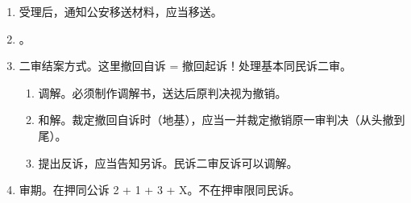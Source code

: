 \begin{enumerate}
\begin{enumerate}
          \item 受理后，通知公安移送材料，应当移送。
          \item {}。
          \item 二审结案方式。这里撤回自诉 = 撤回起诉！处理基本同民诉二审。
                \begin{enumerate}
                  \item 调解。必须制作调解书，送达后原判决视为撤销。
                  \item 和解。裁定撤回自诉时（地基），应当一并裁定撤销原一审判决（从头撤到尾）。
                  \item 提出反诉，应当告知另诉。民诉二审反诉可以调解。
                \end{enumerate}
          \item 审期。在押同公诉 2 + 1 + 3 + X。不在押审限同民诉。
        \end{enumerate}
\end{enumerate}
